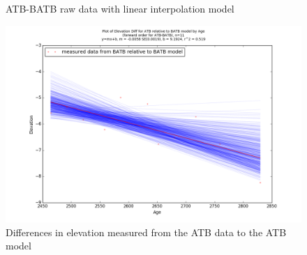 

\newpage
\begin{figure}[t]
	\caption{ATB-BATB raw data with linear interpolation model}
	\label{fig:data_ATBxBATB}
\end{figure}
\newpage

\begin{figure}[t]
	\includegraphics[width=0.9\linewidth]{data/gias/theGIA_ATB_relative_to_BATB.png}
	\caption{Differences in elevation measured from the ATB data to the ATB model}
	\label{fig:gias_ATBxBATB}
\end{figure}
\newpage


